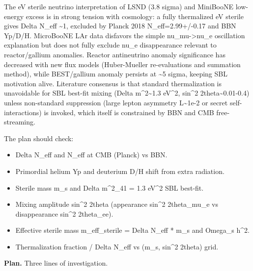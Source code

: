 \documentclass[11pt,a4paper]{article}
\begin{document}
The eV sterile neutrino interpretation of LSND (3.8 sigma) and MiniBooNE low-energy excess is in strong tension with cosmology: a fully thermalized eV sterile gives Delta N\_eff \textasciitilde{}1, excluded by Planck 2018 N\_eff=2.99+/-0.17 and BBN Yp/D/H. MicroBooNE LAr data disfavors the simple nu\_mu-\textgreater{}nu\_e oscillation explanation but does not fully exclude nu\_e disappearance relevant to reactor/gallium anomalies. Reactor antineutrino anomaly significance has decreased with new flux models (Huber-Mueller re-evaluations and summation method), while BEST/gallium anomaly persists at \textasciitilde{}5 sigma, keeping SBL motivation alive. Literature consensus is that standard thermalization is unavoidable for SBL best-fit mixing (Delta m\textasciicircum{}2\textasciitilde{}1.3 eV\textasciicircum{}2, sin\textasciicircum{}2 2theta\textasciitilde{}0.01-0.4) unless non-standard suppression (large lepton asymmetry L\textasciitilde{}1e-2 or secret self-interactions) is invoked, which itself is constrained by BBN and CMB free-streaming.

The plan should check:

\begin{itemize}
  \item Delta N\_eff and N\_eff at CMB (Planck) vs BBN.
  \item Primordial helium Yp and deuterium D/H shift from extra radiation.
  \item Sterile mass m\_s and Delta m\textasciicircum{}2\_41 = 1.3 eV\textasciicircum{}2 SBL best-fit.
  \item Mixing amplitude sin\textasciicircum{}2 2theta (appearance sin\textasciicircum{}2 2theta\_mu\_e vs disappearance sin\textasciicircum{}2 2theta\_ee).
  \item Effective sterile mass m\_eff\_sterile = Delta N\_eff * m\_s and Omega\_s h\textasciicircum{}2.
  \item Thermalization fraction / Delta N\_eff vs (m\_s, sin\textasciicircum{}2 2theta) grid.
\end{itemize}
\textbf{Plan.} Three lines of investigation.
\end{document}
